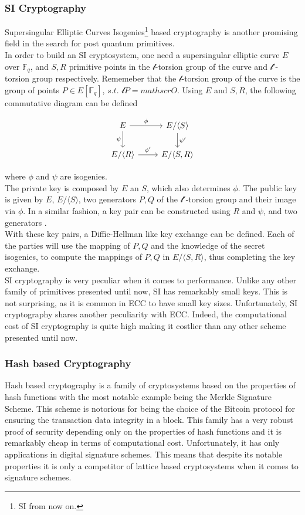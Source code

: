 \subsubsection{SI Cryptography}
Supersingular Elliptic Curves Isogenies\footnote{SI from now on.} based cryptography is another promising field in the search for post quantum primitives.\\
In order to build an SI cryptosystem, one need a supersingular elliptic curve $E$ over $\mathbb{F}_q$, and $S,R$ primitive points in the $\mathscr{l}$-torsion group of the curve and $\mathscr{l'}$-torsion group respectively. Rememeber that the $\mathscr{l}$-torsion group of the curve is the group of points $P\in E[\mathbb{F}_q]$, $s.t.$ $\mathscr{l}P=mathscr{O}$. Using $E$ and $S,R$, the following commutative diagram can be defined

\[\begin{tikzcd}
E \arrow{r}{\phi} \arrow[swap]{d}{\psi} & E/\langle S \rangle \arrow{d}{\psi'} \\
E/\langle R \rangle \arrow{r}{\phi'} & E/\langle S,R \rangle
\end{tikzcd}
\]

where $\phi$ and $\psi$ are isogenies.\\
The private key is composed by $E$ an $S$, which also determines $\phi$. The public key is given by $E$, $E/\langle S \rangle$, two generators $P,Q$ of the $\mathscr{l'}$-torsion group and their image via $\phi$. In a similar fashion, a key pair can be constructed using $R$ and $\psi$, and two generators .\\
With these key pairs, a Diffie-Hellman like key exchange can be defined. Each of the parties will use the mapping of $P,Q$ and the knowledge of the secret isogenies, to compute the mappings of $P,Q$ in $E/\langle S,R \rangle$, thus completing the key exchange.\\
SI cryptography is very peculiar when it comes to performance. Unlike any other family of primitives presented until now, SI has remarkably small keys. This is not surprising, as it is common in ECC to have small key sizes. Unfortunately, SI cryptography shares another peculiarity with ECC. Indeed, the computational cost of SI cryptography is quite high making it costlier than any other scheme presented until now. 

\subsubsection{Hash based Cryptography}
Hash based cryptography is a family of cryptosystems based on the properties of hash functions with the most notable example being the Merkle Signature Scheme. This scheme is notorious for being the choice of the Bitcoin protocol for ensuring the transaction data integrity in a block. This family has a very robust proof of security depending only on the properties of hash functions and it is remarkably cheap in terms of computational cost. Unfortunately, it has only applications in digital signature schemes. This means that despite its notable properties it is only a competitor of lattice based cryptosystems when it comes to signature schemes.
